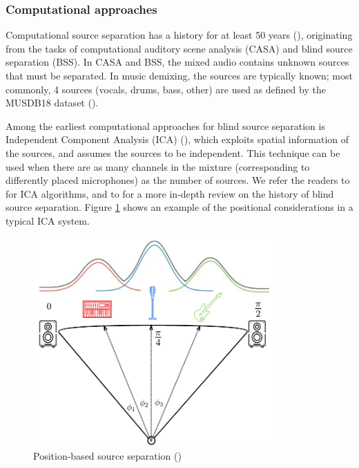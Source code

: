 \documentclass[report.tex]{subfiles}
\begin{document}
\newpagefill

\subsubsection{Computational approaches}

Computational source separation has a history for at least 50 years (\cite{musicsepsurvey, musicsepintro1}), originating from the tasks of computational auditory scene analysis (CASA) and blind source separation (BSS). In CASA and BSS, the mixed audio contains unknown sources that must be separated. In music demixing, the sources are typically known; most commonly, 4 sources (vocals, drums, bass, other) are used as defined by the MUSDB18 dataset (\cite{musdb18}).

Among the earliest computational approaches for blind source separation is Independent Component Analysis (ICA)  (\cite{musicsepsurvey, musicsepgood, musicsepintro1}), which exploits spatial information of the sources, and assumes the sources to be independent. This technique can be used when there are as many channels in the mixture (corresponding to differently placed microphones) as the number of sources. We refer the readers to \textcite{ica1, ica2} for ICA algorithms, and to \textcite{blind1, blind2} for a more in-depth review on the history of blind source separation. Figure \ref{fig:icaposition} shows an example of the positional considerations in a typical ICA system.

\begin{figure}[ht]
	\centering
	\includegraphics[height=8cm]{./images-mss/positional.png}
	\caption{Position-based source separation (\cite{musicsepgood})}
\label{fig:icaposition}
\end{figure}
\end{document}
